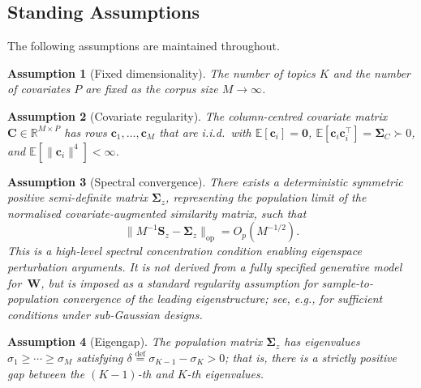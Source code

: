 \documentclass{article}
\newtheorem{assumption}{Assumption}
\begin{document}
\subsection{Standing Assumptions}
\label{subsec:assumptions}

The following assumptions are maintained throughout.

\begin{assumption}[Fixed dimensionality]
\label{ass:fixed_dim}
The number of topics $K$ and the number of covariates $P$ are fixed
as the corpus size $M\to\infty$.
\end{assumption}

\begin{assumption}[Covariate regularity]
\label{ass:covariates}
The column-centred covariate matrix
$\mathbf{C}\in\mathbb{R}^{M\times P}$ has rows
$\mathbf{c}_1,\dots,\mathbf{c}_M$ that are i.i.d.\ with
$\mathbb{E}[\mathbf{c}_i]=\mathbf{0}$,
$\mathbb{E}[\mathbf{c}_i\mathbf{c}_i^{\!\top}]
 = \boldsymbol{\Sigma}_C \succ 0$, and
$\mathbb{E}[\|\mathbf{c}_i\|^4]<\infty$.
\end{assumption}

\begin{assumption}[Spectral convergence]
\label{ass:spectral_convergence}
There exists a deterministic symmetric positive semi-definite matrix
$\boldsymbol{\Sigma}_z$, representing the population limit of the
normalised covariate-augmented similarity matrix, such that
\begin{equation}
  \bigl\|M^{-1}\mathbf{S}_z
    - \boldsymbol{\Sigma}_z\bigr\|_{\mathrm{op}}
  = O_p(M^{-1/2}).
  \label{eq:spectral_convergence}
\end{equation}
This is a high-level spectral concentration condition enabling
eigenspace perturbation arguments. It is not derived from a fully
specified generative model for~$\mathbf{W}$, but is imposed as a
standard regularity assumption for sample-to-population convergence of
the leading eigenstructure; see, e.g.,
\citet{vershynin2012close} for sufficient conditions under
sub-Gaussian designs.
\end{assumption}

\begin{assumption}[Eigengap]
\label{ass:eigengap}
The population matrix $\boldsymbol{\Sigma}_z$ has eigenvalues
$\sigma_1\geq\cdots\geq\sigma_M$ satisfying
$\delta \stackrel{\text{def}}{=}
 \sigma_{K-1} - \sigma_K > 0$;
that is, there is a strictly positive gap between the $(K{-}1)$-th
and $K$-th eigenvalues.
\end{assumption}
\end{document}
